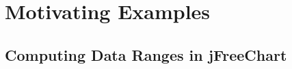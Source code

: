 \section{Motivating Examples}
\label{empi}

\subsection{Computing Data Ranges in jFreeChart}
\label{example1sec}



